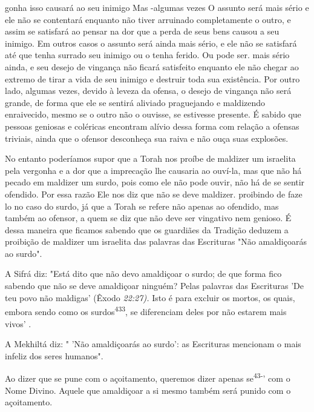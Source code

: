 \begin{itemize}
\begin{enumrate}
\begin{itemize}
\begin{itemize}
\begin{itemize}
gonha isso causará ao seu inimigo Mas -algumas vezes O assunto será mais
sério e ele não se contentará enquanto não tiver arruinado completamente
o outro, e assim se satisfará ao pensar na dor que a perda de seus bens
causou a seu inimigo. Em outros casos o assunto será ainda mais sério, e
ele não se satisfará até que tenha surrado seu inimigo ou o tenha
ferido. Ou pode ser. mais sério ainda, e seu desejo de
vingança não ficará satisfeito enquanto ele não chegar ao extremo de
tirar a vida de seu inimigo e destruir toda sua existência. Por outro
lado, algumas vezes, devido à leveza da ofensa, o desejo de vingança não
será grande, de forma que ele se sentirá aliviado praguejando e
maldizendo enraivecido, mesmo se o outro não o ouvisse, se estivesse
pre­sente. É sabido que pessoas geniosas e coléricas encontram alívio
dessa forma com relação a ofensas triviais, ainda que o ofensor
desconheça sua raiva e não ouça suas explosões.

No entanto poderíamos supor que a Torah nos proíbe de maldizer um
israelita pela vergonha e a dor que a imprecação lhe causaria ao
ouví-la, mas que não há pecado em maldizer um surdo, pois como ele não
pode ouvir, não há de se sentir ofendido. Por essa razão Ele nos diz que
não se deve maldi­zer. proibindo de faze lo no caso do surdo, já que a
Torah se refere não apenas ao ofendido, mas também ao ofensor, a quem se
diz que não deve ser vingati­vo nem genioso. É dessa maneira que ficamos
sabendo que os guardiães da Tra­dição deduzem a proibição de maldizer um
israelita das palavras das Escrituras "Não amaldiçoarás ao surdo".

A Sifrá diz: "Está dito que não devo amaldiçoar o surdo; de que for­ma
fico sabendo que não se deve amaldiçoar ninguém? Pelas palavras das
Es­crituras 'De teu povo não maldigas' (Êxodo \emph{22:27).} Isto é para
excluir os mor­tos, os quais, embora sendo como os
surdos\textsuperscript{433}, se diferenciam deles por não estarem mais
vivos' .

A Mekhiltá diz: " 'Não amaldiçoarás ao surdo': as Escrituras mencio­nam
o mais infeliz dos seres humanos".

Ao dizer que se pune com o açoitamento, queremos dizer apenas
se\textsuperscript{43-}' com o Nome Divino. Aquele que amaldiçoar a si
mesmo também será pu­nido com o açoitamento.


\end{itemize}
\end{itemize}
\end{itemize}
\end{enumrate}
\end{itemize}

